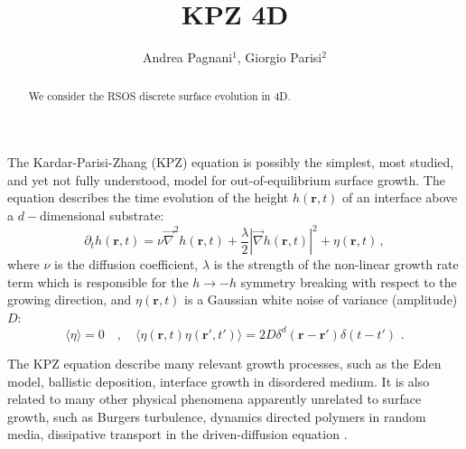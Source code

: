 \documentclass[prl,showpacs,amssymb,floatfix]{revtex4-1}
\begin{document}
\title{KPZ 4D}
\author{Andrea Pagnani$^1$, Giorgio Parisi$^2$}



\begin{abstract}
  We consider the RSOS discrete surface evolution in 4D.
\end{abstract}


\maketitle 

The Kardar-Parisi-Zhang (KPZ) \cite{KPZ86} equation is possibly the
simplest, most studied, and yet not fully understood, model for
out-of-equilibrium surface growth. The equation describes the time
evolution of the height $h({\mathbf r}, t)$ of an interface above a
$d-$dimensional substrate:
\begin{equation}
\label{eq:KPZ}
\partial_t h({\mathbf r}, t) = \nu {\vec \nabla}^2 h({\mathbf r}, t) +
\frac \lambda 2 | {\vec \nabla}h({\mathbf r}, t)|^2 +\eta({\mathbf r}, t) \, ,
\end{equation}
where $\nu$ is the diffusion coefficient, $\lambda$ is the strength of
the non-linear growth rate term which is responsible for the $h
\rightarrow -h$ symmetry breaking with respect to the growing
direction, and $\eta({\mathbf r},t)$ is a Gaussian white noise of
variance (amplitude) $D$:
\begin{equation}
\label{eq:noise}
\langle \eta \rangle = 0 \,\,\,\,\,\,,\,\,\,\,\,\,
\langle \eta({\mathbf r},t) \eta({\mathbf r}',t') \rangle 
= 2D \delta^d({\mathbf r} - {\mathbf r}')
\delta(t-t')\,\,. 
\end{equation}

The KPZ equation describe many relevant growth processes, such as the
Eden model, ballistic deposition, interface growth in disordered
medium. It is also related to many other physical phenomena apparently
unrelated to surface growth, such as Burgers turbulence, dynamics
directed polymers in random media, dissipative transport in the
driven-diffusion equation \cite{FamilyVicsekBook, *BarabasiBook}.
\end{document}
